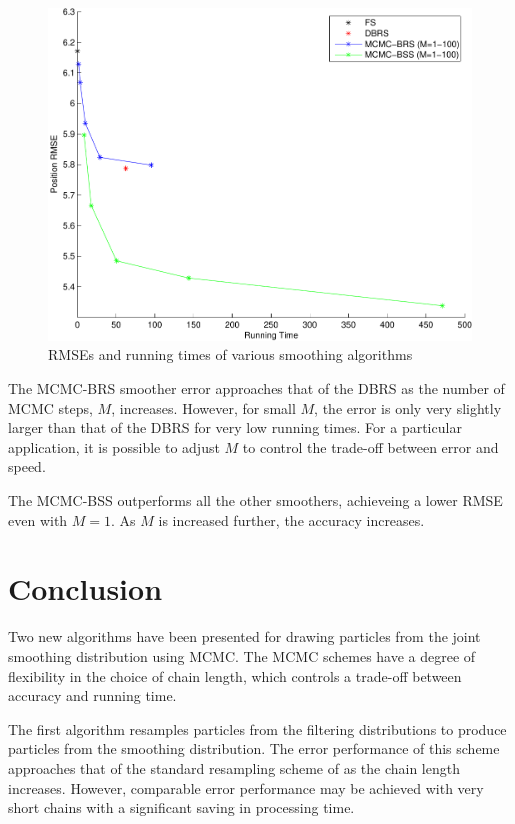 \documentclass[journal]{IEEEtran}
\begin{document}
\begin{figure}[!t]
\centering
\includegraphics[width=0.8\columnwidth]{case2_smoother_comparison_posRMSE_time-crop.pdf}%
\caption{RMSEs and running times of various smoothing algorithms}%
\label{fig:case2_rmse_vs_time}%
\end{figure}

The MCMC-BRS smoother error approaches that of the DBRS as the number of MCMC steps, $M$, increases. However, for small $M$, the error is only very slightly larger than that of the DBRS for very low running times. For a particular application, it is possible to adjust $M$ to control the trade-off between error and speed.

The MCMC-BSS outperforms all the other smoothers, achieveing a lower RMSE even with $M=1$. As $M$ is increased further, the accuracy increases.



\section{Conclusion} \label{sec:conclusions}
Two new algorithms have been presented for drawing particles from the joint smoothing distribution using MCMC. The MCMC schemes have a degree of flexibility in the choice of chain length, which controls a trade-off between accuracy and running time.

The first algorithm resamples particles from the filtering distributions to produce particles from the smoothing distribution. The error performance of this scheme approaches that of the standard resampling scheme of \cite{Godsill2004} as the chain length increases. However, comparable error performance may be achieved with very short chains with a significant saving in processing time.
\end{document}
